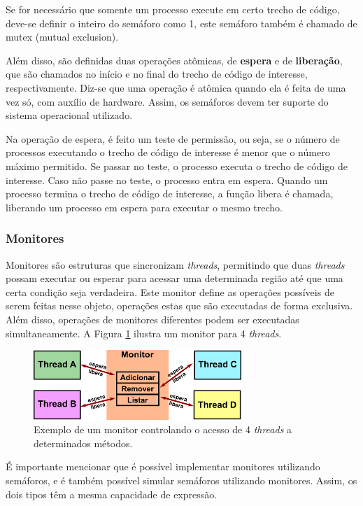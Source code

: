 Se for necessário que somente um processo execute em certo trecho de código, deve-se definir o inteiro do semáforo como 1, este semáforo também é chamado de mutex (mutual exclusion).

Além disso, são definidas duas operações atômicas, de \textbf{espera} e de \textbf{liberação}, que são chamados no início e no final do trecho de código de interesse, respectivamente. Diz-se que uma operação é atômica quando ela é feita de uma vez só, com auxílio de hardware. Assim, os semáforos devem ter suporte do sistema operacional utilizado.

Na operação de espera, é feito um teste de permissão, ou seja, se o número de processos executando o trecho de código de interesse é menor que o número máximo permitido. Se passar no teste, o processo executa o trecho de código de interesse. Caso não passe no teste, o processo entra em espera. Quando um processo termina o trecho de código de interesse, a função libera é chamada, liberando um processo em espera para executar o mesmo trecho.


\subsubsection{Monitores}

Monitores são estruturas que sincronizam \textit{threads}, permitindo que duas \textit{threads} possam executar ou esperar para acessar uma determinada região até que uma certa condição seja verdadeira. Este monitor define as operações possíveis de serem feitas nesse objeto, operações estas que são executadas de forma exclusiva. Além disso, operações de monitores diferentes podem ser executadas simultaneamente. A Figura \ref{fig:monitor} ilustra um monitor para 4 \textit{threads}.

\begin{figure}[htbp]
	\centering
	\includegraphics[width=0.7\textwidth]{fig/monitor.png}
	\caption{Exemplo de um monitor controlando o acesso de 4 \textit{threads} a determinados métodos.} 
	\label{fig:monitor}
\end{figure}

É importante mencionar que é possível implementar monitores utilizando semáforos, e é também possível simular semáforos utilizando monitores. Assim, os dois tipos têm a mesma capacidade de expressão.


